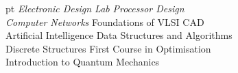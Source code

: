 \documentclass[a4paper,11pt]{article}
\newcommand{\isep}{-2 pt}
\begin{document}

\begin{tabbing}\itemsep \isep
        \hspace{1cm}\= \emph{Electronic Design Lab} \hspace{3cm} \quad\= \emph{Processor Design} \\
                \> \emph{Computer Networks}  \>Foundations of VLSI CAD \\
                \> Artificial Intelligence  \> Data Structures and Algorithms \\
                \> Discrete Structures \> First Course in Optimisation \\
                \>Introduction to Quantum Mechanics \\
 \end{tabbing}
\end{document}

